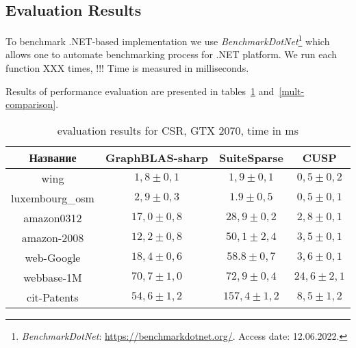\subsection{Evaluation Results}

To benchmark .NET-based implementation we use \textit{BenchmarkDotNet}\footnote{\textit{BenchmarkDotNet}: \url{https://benchmarkdotnet.org/}. Access date: 12.06.2022.} which allows one to automate benchmarking process for .NET platform.
We run each function XXX times, !!!
Time is measured in milliseconds.

Results of performance evaluation are presented in tables~\ref{add-comparison} and~\ref{mult-comparison}.


\begin{table}[h]
    \centering
    \caption{evaluation results for CSR, GTX 2070, time in ms}
    \label{add-comparison}

    \begin{tabular}{|c||c|c|c|}
    \hline
    Название            & GraphBLAS-sharp & SuiteSparse & CUSP        \\
    \hline
    \hline
    wing            & $1,8 \pm 0,1$      & $1,9\pm 0,1$   & $0,5\pm 0,2$   \\
    \hline
    luxembourg\_osm & $2,9 \pm 0,3$      & $1.9\pm 0,5$   & $0,5\pm 0,1$   \\
    \hline
    amazon0312      & $17,0 \pm 0,8$      & $28,9\pm 0,2$  & $2,8\pm 0,1$   \\
    \hline
    amazon-2008     & $12,2 \pm 0,8$     & $50,1\pm 2,4$  & $3,5\pm 0,1$   \\
    \hline
    web-Google      & $18,4 \pm 0,6$     & $58.8\pm 0,7$  & $3,6\pm 0,1$   \\
    \hline
    webbase-1M      & $70,7 \pm 1,0$      & $72,9\pm 0,4$  & $24,6\pm 2,1$  \\
    \hline
    cit-Patents     & $54,6 \pm 1,2$      & $157,4\pm 1,2$ & $8,5\pm 1,2$   \\     
    \hline
    \end{tabular}
\end{table}

